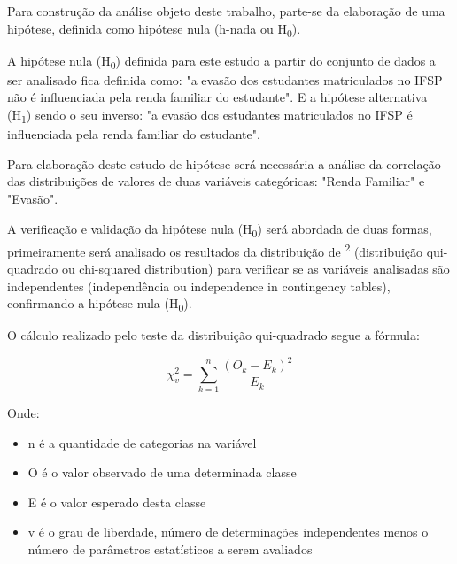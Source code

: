 \documentclass[conference]{IEEEtran}
\begin{document}
Para construção da análise objeto deste trabalho, parte-se da elaboração de uma hipótese, definida como hipótese nula (h-nada ou H\textsubscript{0}).\par
A hipótese nula (H\textsubscript{0}) definida para este estudo a partir do conjunto de dados a ser analisado fica definida como: "a evasão dos estudantes matriculados no IFSP não é influenciada pela renda familiar do estudante". E a hipótese alternativa (H\textsubscript{1}) sendo o seu inverso: "a evasão dos estudantes matriculados no IFSP é influenciada pela renda familiar do estudante".\par
Para elaboração deste estudo de hipótese será necessária a análise da correlação das distribuições de valores de duas variáveis categóricas: "Renda Familiar" e "Evasão".\par
A verificação e validação da hipótese nula (H\textsubscript{0}) será abordada de duas formas, primeiramente será analisado os resultados da distribuição de \raisebox{2pt}{$\chi$}\textsuperscript{2} (distribuição qui-quadrado ou chi-squared distribution) para verificar se as variáveis analisadas são independentes (independência ou independence in contingency tables), confirmando a hipótese nula (H\textsubscript{0}).\par
O cálculo realizado pelo teste da distribuição qui-quadrado segue a fórmula:\par

\[ \chi_{v}^{2} = \sum_{k=1}^{n} \frac{(O_k - E_k)^2}{E_k} \]

Onde:

\begin{itemize}
    \item n é a quantidade de categorias na variável
    \item O é o valor observado de uma determinada classe
    \item E é o valor esperado desta classe
    \item v é o grau de liberdade, número de determinações independentes menos o número de parâmetros estatísticos a serem avaliados
\end{itemize}
\end{document}
